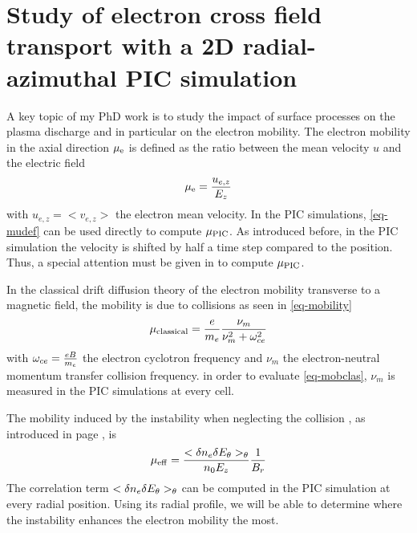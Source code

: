 
\section{Study of electron cross field transport with a 2D radial-azimuthal PIC simulation}
  \label{sec-transport}
  

  A key topic of my PhD work is to study the impact of surface processes on the plasma discharge and in particular on the electron mobility.   
  The electron mobility in the axial direction $\mu_{\mathrm{e}}$ is defined as the ratio between the mean velocity $u$ and the electric field
  \begin{equation} \label{eq-mudef}
    \mu_{\mathrm{e}} = \frac{u_{e,z}}{E_z}
  \end{equation}
  with $u_{e,z}=<v_{e,z}>$ the electron mean velocity.
  In the \ac{PIC} simulations, \cref{eq-mudef} can be used directly to compute $\mu_{\mathrm{PIC}}$.
  As introduced before, in the \ac{PIC} simulation the velocity is shifted by half a time step compared to the position.
  Thus, a special attention must be given in to compute $\mu_{\mathrm{PIC}}$.
  
  In the classical drift diffusion theory of the electron mobility transverse to a magnetic field, the mobility is due to collisions as seen in \cref{eq-mobility} 
  \begin{equation} \label{eq-mobclas}
    \mu_{\mathrm{classical}} = \frac{e}{m_e} \frac{\nu_m}{\nu_m^2 + \omega_{ce}^2}
  \end{equation}
  with $\omega_{ce}=\frac{e B}{m_e}$ the electron cyclotron frequency and $\nu_m$ the electron-neutral momentum transfer collision frequency.
  in order to evaluate \cref{eq-mobclas},  $\nu_m$ is measured in the \ac{PIC} simulations at every cell.

  The mobility induced by the instability when neglecting the collision , as introduced in page , is 
  \begin{equation} \label{eq-eq_mobeffsimple_two}
      \mu_{\mathrm{eff}} = \frac{< \delta n_e \delta E_{\theta} >_{\theta} }{n_0 E_z}   \frac{1}{B_r}
  \end{equation}
  The correlation term $< \delta n_e \delta E_{\theta} >_{\theta}$ can be computed in the \ac{PIC} simulation at every radial position.
  Using its radial profile, we will be able to determine where the instability enhances the electron mobility the most.
  
